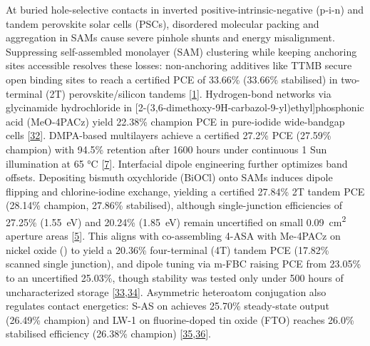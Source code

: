 \documentclass[
  11pt,
]{article}
\begin{document}
At buried hole-selective contacts in inverted
positive-intrinsic-negative (p-i-n) and tandem perovskite solar cells
(PSCs), disordered molecular packing and aggregation in SAMs cause
severe pinhole shunts and energy misalignment. Suppressing
self-assembled monolayer (SAM) clustering while keeping anchoring sites
accessible resolves these losses: non-anchoring additives like TTMB
secure open binding sites to reach a certified PCE of 33.66\% (33.66\%
stabilised) in two-terminal (2T) perovskite/silicon tandems
{[}\href{https://doi.org/10.1038/s41467-026-76266-0}{1}{]}.
Hydrogen-bond networks via glycinamide hydrochloride in
{[}2-(3,6-dimethoxy-9H-carbazol-9-yl)ethyl{]}phosphonic acid (MeO-4PACz)
yield 22.38\% champion PCE in pure-iodide wide-bandgap cells
{[}\href{https://doi.org/10.1016/j.decarb.2026.100190}{32}{]}.
DMPA-based multilayers achieve a certified 27.2\% PCE (27.59\% champion)
with 94.5\% retention after 1600 hours under continuous 1 Sun
illumination at 65 °C
{[}\href{https://doi.org/10.1038/s41467-026-76497-1}{7}{]}. Interfacial
dipole engineering further optimizes band offsets. Depositing bismuth
oxychloride (BiOCl) onto SAMs induces dipole flipping and
chlorine-iodine exchange, yielding a certified 27.84\% 2T tandem PCE
(28.14\% champion, 27.86\% stabilised), although single-junction
efficiencies of 27.25\% (\qty{1.55}{\electronvolt}) and 20.24\%
(\qty{1.85}{\electronvolt}) remain uncertified on small
\qty{0.09}{\centi\meter\squared} aperture areas
{[}\href{https://doi.org/10.1038/s41467-026-76786-9}{5}{]}. This aligns
with co-assembling 4-ASA with Me-4PACz on nickel oxide () to
yield a 20.36\% four-terminal (4T) tandem PCE (17.82\% scanned single
junction), and dipole tuning via m-FBC raising PCE from 23.05\% to an
uncertified 25.03\%, though stability was tested only under 500 hours of
uncharacterized storage
{[}\href{https://doi.org/10.1038/s41467-026-76847-z}{33},\href{https://doi.org/10.1021/acsami.6c11467}{34}{]}.
Asymmetric heteroatom conjugation also regulates contact energetics:
S-AS on  achieves 25.70\% steady-state output (26.49\%
champion) and LW-1 on fluorine-doped tin oxide (FTO) reaches 26.0\%
stabilised efficiency (26.38\% champion)
{[}\href{https://doi.org/10.1002/adfm.77712}{35},\href{https://doi.org/10.1002/aenm.71482}{36}{]}.
\end{document}
